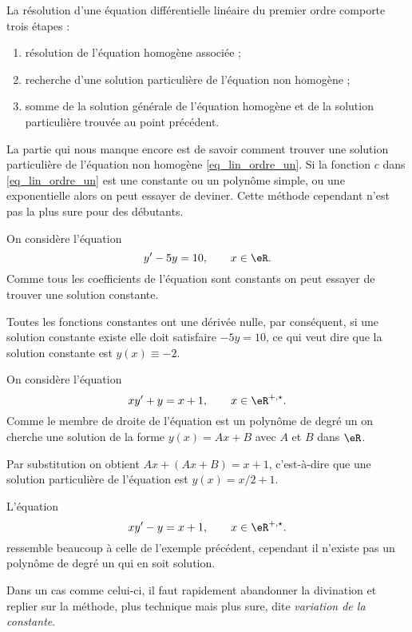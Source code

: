 \begin{Aretenir}
	La résolution d'une équation différentielle linéaire du premier ordre comporte trois étapes :
	\begin{enumerate}
		\item résolution de l'équation homogène associée ;
		\item recherche d'une solution particulière de l'équation non homogène ;
		\item somme de la solution générale de l'équation homogène et de la solution particulière trouvée au point précédent.
	\end{enumerate}
\end{Aretenir}
La partie qui nous manque encore est de savoir comment trouver une solution particulière de l'équation non homogène \eqref{eq_lin_ordre_un}. Si la fonction \( c\) dans \eqref{eq_lin_ordre_un} est une constante ou un polynôme simple, ou une exponentielle alors on peut essayer de deviner. Cette méthode cependant n'est pas la plus sure pour des débutants.

\begin{example}
	On considère l'équation
	\begin{equation}
		y'-5y = 10, \qquad x\in\eR.
	\end{equation}
	Comme tous les coefficients de l'équation sont constants on peut essayer de trouver une solution constante.

	Toutes les fonctions constantes ont une dérivée nulle, par conséquent, si une solution constante existe elle doit satisfaire \( -5y = 10\), ce qui veut dire que la solution constante est \( y(x)\equiv -2\).
\end{example}

\begin{example}
	On considère l'équation
	\begin{equation}
		xy'+y = x+1, \qquad x\in\eR^{+,\star}.
	\end{equation}
	Comme le membre de droite de l'équation est un polynôme de degré un on cherche une solution de la forme \( y(x) = Ax + B\) avec \( A\) et \( B\) dans \( \eR\).

	Par substitution on obtient \( Ax + (Ax +B) = x+1\), c'est-à-dire que une solution particulière de l'équation est \( y(x) = x/2+1\).
\end{example}

\begin{example}
	L'équation
	\begin{equation}
		xy'-y = x+1, \qquad x\in\eR^{+,\star}.
	\end{equation}
	ressemble beaucoup à celle de l'exemple précédent, cependant il n'existe pas un polynôme de degré un qui en soit solution.

	Dans un cas comme celui-ci, il faut rapidement abandonner la divination et replier sur la méthode, plus technique mais plus sure, dite  \emph{variation de la constante}.
\end{example}


